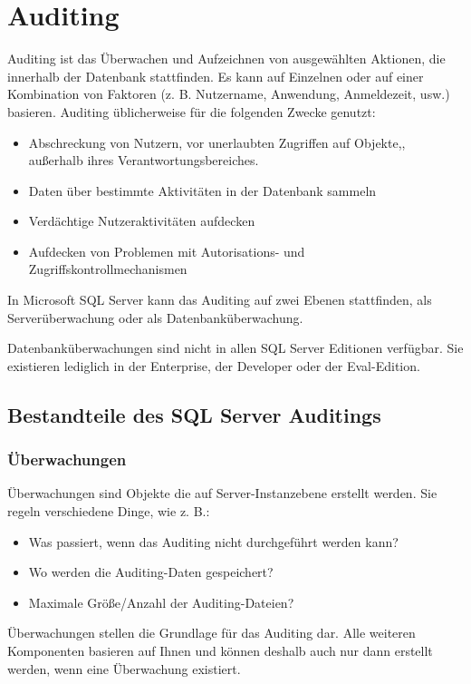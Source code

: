   \chapter{Auditing}
    \chaptertoc{}
    \cleardoubleevenpage
      Auditing ist das \"Uberwachen und Aufzeichnen von ausgew\"ahlten Aktionen,
      die innerhalb der Datenbank stattfinden. Es kann auf Einzelnen oder auf
      einer Kombination von Faktoren (z. B. Nutzername, Anwendung, Anmeldezeit,
      usw.) basieren. Auditing \"ublicherweise f\"ur die folgenden Zwecke
      genutzt:
      \begin{itemize}
        \item Abschreckung von Nutzern, vor unerlaubten Zugriffen auf Objekte,,
        au\ss erhalb ihres Verantwortungsbereiches.
        \item Daten \"uber bestimmte Aktivit\"aten in der Datenbank sammeln
        \item Verd\"achtige Nutzeraktivit\"aten aufdecken
        \item Aufdecken von Problemen mit Autorisations- und Zugriffskontrollmechanismen
      \end{itemize}
      In Microsoft SQL Server kann das Auditing auf zwei Ebenen stattfinden, als
      Serverüberwachung oder als Datenbanküberwachung.
      \begin{merke}
        Datenbanküberwachungen sind nicht in allen SQL Server Editionen
        verfügbar. Sie existieren lediglich in der Enterprise, der Developer
        oder der Eval-Edition.
      \end{merke}
    \section{Bestandteile des SQL Server Auditings}
      \subsection{Überwachungen}
        Überwachungen sind Objekte die auf Server-Instanzebene erstellt
        werden. Sie regeln verschiedene Dinge, wie z. B.:
        \begin{itemize}
          \item Was passiert, wenn das Auditing nicht durchgeführt werden
          kann?
          \item Wo werden die Auditing-Daten gespeichert?
          \item Maximale Größe/Anzahl der Auditing-Dateien?
        \end{itemize}
        Überwachungen stellen die Grundlage für das Auditing dar. Alle
        weiteren Komponenten basieren auf Ihnen und können deshalb auch nur
        dann erstellt werden, wenn eine Überwachung existiert.
